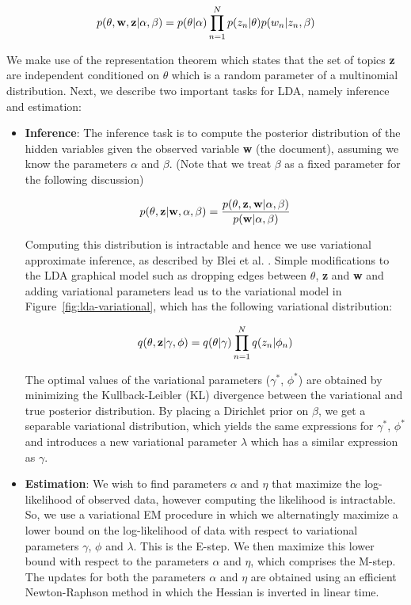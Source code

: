 \documentclass{article} %
\begin{document}
\begin{equation} 
p(\theta,{\bf w},{\bf z} | \alpha,\beta ) = p(\theta|\alpha)\prod_{n=1}^{N}p(z_{n}|\theta)p(w_{n}|z_{n},\beta) 
\end{equation}

We make use of the representation theorem which states that the set of topics
{\bf z} are independent conditioned on $\theta$ which is a random parameter of 
a multinomial distribution. Next, we describe two important tasks for LDA, 
namely inference and estimation:

\begin{itemize}[leftmargin=*]

\item[] {\bf Inference}: The inference task is to compute the posterior 
distribution of the hidden variables given the observed variable {\bf w} (the 
document), assuming we know the parameters $\alpha$ and $\beta$. (Note that 
we treat $\beta$ as a fixed parameter for the following discussion)

\begin{equation} 
p(\theta,{\bf z} | {\bf w},\alpha,\beta ) = \frac{p(\theta,{\bf z}, {\bf w}|\alpha,\beta)}{p({\bf w}|\alpha,\beta)} 
\end{equation}

Computing this distribution is intractable and hence we use variational 
approximate inference, as described by Blei et al. \cite{lda}. Simple 
modifications to the LDA graphical model such as dropping edges between 
$\theta$, {\bf z} and 
{\bf w} and adding variational parameters lead us to the variational model in Figure~\ref{fig:lda-variational}, which has the following variational distribution:
 
\begin{equation} 
q(\theta,{\bf z}|\gamma, \phi) = q(\theta|\gamma)\prod_{n=1}^{N}q(z_{n}|\phi_{n})
\end{equation}

The optimal values of the variational parameters ($\gamma^{*}$, $\phi^{*}$) are 
obtained by minimizing the
Kullback-Leibler (KL) divergence between the variational and true posterior
distribution. By placing a Dirichlet prior on $\beta$, we get a separable 
variational distribution, which yields the same expressions for $\gamma^{*}$, 
$\phi^{*}$ and introduces a new variational parameter $\lambda$ which has a 
similar expression as $\gamma$.

\item[] {\bf Estimation}: We wish to find parameters $\alpha$ and $\eta$ that
maximize the log-likelihood of observed data, however computing the likelihood
is intractable. So, we use a variational EM procedure in which we alternatingly
maximize a lower bound on the log-likelihood of data with respect to 
variational parameters $\gamma$, $\phi$ and $\lambda$. This is the E-step. We 
then maximize this lower bound with respect to the parameters $\alpha$ and 
$\eta$, which comprises the M-step. The updates for both the parameters $\alpha$
and $\eta$ are obtained using an efficient Newton-Raphson method in which the 
Hessian is inverted in linear time.

\end{itemize}
\end{document}
